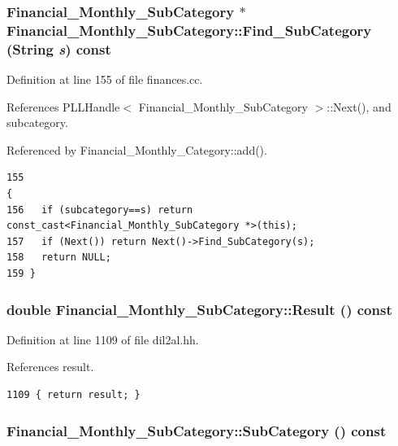 \subsubsection{\setlength{\rightskip}{0pt plus 5cm}Financial\_\-Monthly\_\-Sub\-Category $\ast$ Financial\_\-Monthly\_\-Sub\-Category::Find\_\-Sub\-Category ({\bf String} {\em s}) const}\label{classFinancial__Monthly__SubCategory_a2}




Definition at line 155 of file finances.cc.

References PLLHandle$<$ Financial\_\-Monthly\_\-Sub\-Category $>$::Next(), and subcategory.

Referenced by Financial\_\-Monthly\_\-Category::add().



\footnotesize\begin{verbatim}155                                                                                               {
156   if (subcategory==s) return const_cast<Financial_Monthly_SubCategory *>(this);
157   if (Next()) return Next()->Find_SubCategory(s);
158   return NULL;
159 }
\end{verbatim}\normalsize 
{}
\subsubsection{\setlength{\rightskip}{0pt plus 5cm}double Financial\_\-Monthly\_\-Sub\-Category::Result () const\hspace{0.3cm}{\tt  [inline]}}\label{classFinancial__Monthly__SubCategory_a3}




Definition at line 1109 of file dil2al.hh.

References result.



\footnotesize\begin{verbatim}1109 { return result; }
\end{verbatim}\normalsize 
{}
\subsubsection{ Financial\_\-Monthly\_\-Sub\-Category::Sub\-Category () const\hspace{0.3cm}{\tt  [inline]}}\label{classFinancial__Monthly__SubCategory_a1}





